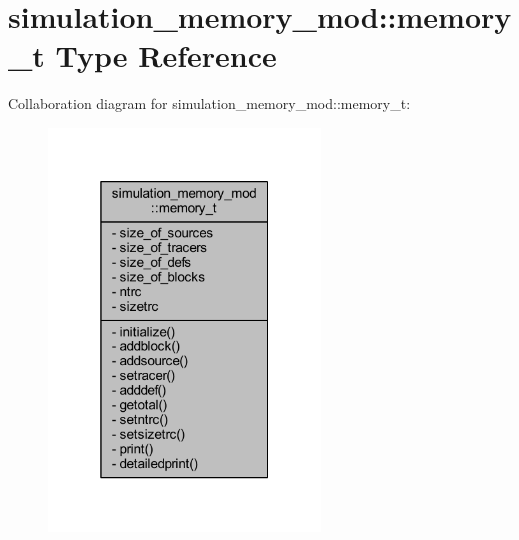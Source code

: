 \hypertarget{structsimulation__memory__mod_1_1memory__t}{}\section{simulation\+\_\+memory\+\_\+mod\+:\+:memory\+\_\+t Type Reference}
\label{structsimulation__memory__mod_1_1memory__t}


Collaboration diagram for simulation\+\_\+memory\+\_\+mod\+:\+:memory\+\_\+t\+:
\nopagebreak
\begin{figure}[H]
\begin{center}
\leavevmode
\includegraphics[width=205pt]{structsimulation__memory__mod_1_1memory__t__coll__graph}
\end{center}
\end{figure}
